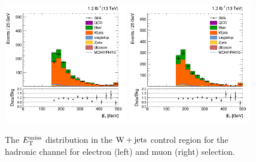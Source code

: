 \begin{figure}[htbp]
  \centering
  \includegraphics[width=0.48\textwidth]{figures/hMETlinear_CRwjets_el.png}
  \includegraphics[width=0.48\textwidth]{figures/hMETlinear_CRwjets_mu.png}
  \caption{The $E_\mathrm{T}^{\mathrm{miss}}$ distribution in the $\mathrm{W+jets}$ control region for the hadronic channel for electron (left) and muon (right) selection.}
  \label{fig:incl_hadronic_1l0b_fmet}
\end{figure}






